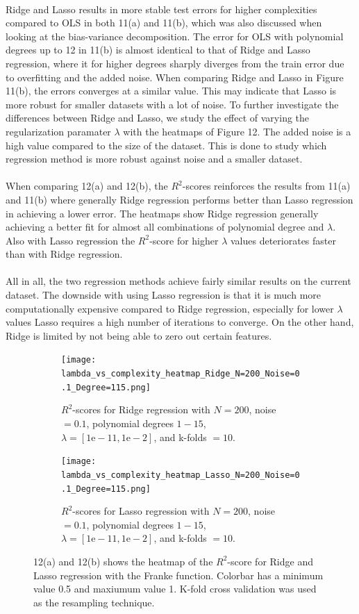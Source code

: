 \documentclass[a4paper,twocolumn]{article}
\begin{document}
\\
Ridge and Lasso results in more stable test errors for higher complexities compared to OLS in both 11(a) and 11(b), which was also discussed when looking at the bias-variance decomposition. The error for OLS with polynomial degrees up to 12 in 11(b) is almost identical to that of Ridge and Lasso regression, where it for higher degrees sharply diverges from the train error due to overfitting and the added noise. When comparing Ridge and Lasso in Figure 11(b), the errors converges at a similar value. This may indicate that Lasso is more robust for smaller datasets with a lot of noise. To further investigate the differences between Ridge and Lasso, we study the effect of varying the regularization paramater $\lambda$ with the heatmaps of Figure 12. The added noise is a high value compared to the size of the dataset. This is done to study which regression method is more robust against noise and a smaller dataset.\\
\\
When comparing 12(a) and 12(b), the $R^{2}$-scores reinforces the results from 11(a) and 11(b) where generally Ridge regression performs better than Lasso regression in achieving a lower error. The heatmaps show Ridge regression generally achieving a better fit for almost all combinations of polynomial degree and $\lambda$. Also with Lasso regression the $R^{2}$-score for higher $\lambda$ values deteriorates faster than with Ridge regression. \\
\\
All in all, the two regression methods achieve fairly similar results on the current dataset. The downside with using Lasso regression is that it is much more computationally expensive compared to Ridge regression, especially for lower $\lambda$ values Lasso requires a high number of iterations to converge. On the other hand, Ridge is limited by not being able to zero out certain features. \\
\begin{figure}[ht]
    \centering
    \begin{subfigure}[b]{0.9\columnwidth}
        \texttt{[image: lambda\_vs\_complexity\_heatmap\_Ridge\_N=200\_Noise=0.1\_Degree=115.png]}
        \caption{$R^{2}$-scores for Ridge regression with $N = 200$, noise $= 0.1$, polynomial degrees $1- 15$, $\lambda = [1\textrm{e}-11, 1\textrm{e}-2]$, and k-folds $= 10$.}
    \end{subfigure}
    
    \begin{subfigure}[b]{0.9\columnwidth}
        \texttt{[image: lambda\_vs\_complexity\_heatmap\_Lasso\_N=200\_Noise=0.1\_Degree=115.png]}
        \caption{$R^{2}$-scores for Lasso regression with $N = 200$, noise $= 0.1$, polynomial degrees $1- 15$, $\lambda = [1\textrm{e}-11, 1\textrm{e}-2]$, and k-folds $= 10$.}
    \end{subfigure}
    \caption{12(a) and 12(b) shows the heatmap of the $R^{2}$-score for Ridge and Lasso regression with the Franke function. Colorbar has a minimum value 0.5 and maxiumum value 1. K-fold cross validation was used as the resampling technique.}
\end{figure}\\
\end{document}
